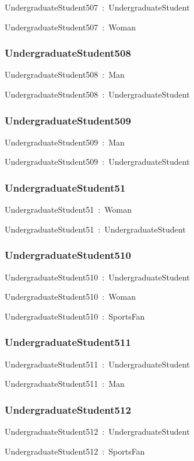 \documentclass{article}
\begin{document}
UndergraduateStudent507~:~UndergraduateStudent

UndergraduateStudent507~:~Woman

\subsubsection*{UndergraduateStudent508}

UndergraduateStudent508~:~Man

UndergraduateStudent508~:~UndergraduateStudent

\subsubsection*{UndergraduateStudent509}

UndergraduateStudent509~:~Man

UndergraduateStudent509~:~UndergraduateStudent

\subsubsection*{UndergraduateStudent51}

UndergraduateStudent51~:~Woman

UndergraduateStudent51~:~UndergraduateStudent

\subsubsection*{UndergraduateStudent510}

UndergraduateStudent510~:~UndergraduateStudent

UndergraduateStudent510~:~Woman

UndergraduateStudent510~:~SportsFan

\subsubsection*{UndergraduateStudent511}

UndergraduateStudent511~:~UndergraduateStudent

UndergraduateStudent511~:~Man

\subsubsection*{UndergraduateStudent512}

UndergraduateStudent512~:~UndergraduateStudent

UndergraduateStudent512~:~SportsFan
\end{document}
